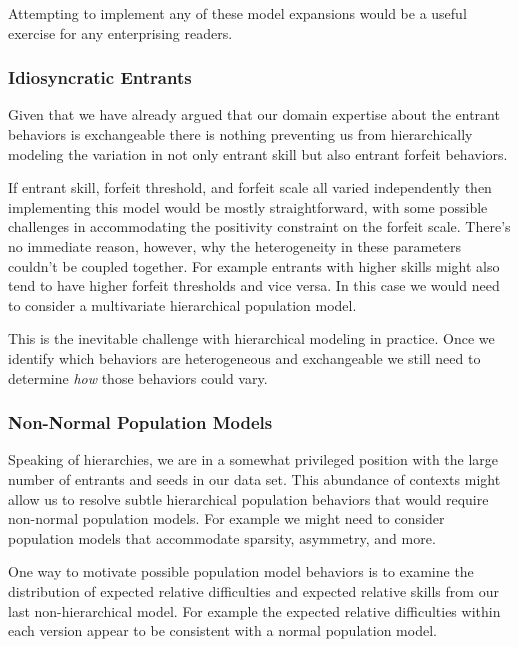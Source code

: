 \documentclass[
  letterpaper,
  DIV=11,
  numbers=noendperiod]{scrartcl}
\begin{document}
Attempting to implement any of these model expansions would be a useful
exercise for any enterprising readers.

\subsubsection{Idiosyncratic Entrants}\label{idiosyncratic-entrants}

Given that we have already argued that our domain expertise about the
entrant behaviors is exchangeable there is nothing preventing us from
hierarchically modeling the variation in not only entrant skill but also
entrant forfeit behaviors.

If entrant skill, forfeit threshold, and forfeit scale all varied
independently then implementing this model would be mostly
straightforward, with some possible challenges in accommodating the
positivity constraint on the forfeit scale. There's no immediate reason,
however, why the heterogeneity in these parameters couldn't be coupled
together. For example entrants with higher skills might also tend to
have higher forfeit thresholds and vice versa. In this case we would
need to consider a multivariate hierarchical population model.

This is the inevitable challenge with hierarchical modeling in practice.
Once we identify which behaviors are heterogeneous and exchangeable we
still need to determine \emph{how} those behaviors could vary.

\subsubsection{Non-Normal Population
Models}\label{non-normal-population-models}

Speaking of hierarchies, we are in a somewhat privileged position with
the large number of entrants and seeds in our data set. This abundance
of contexts might allow us to resolve subtle hierarchical population
behaviors that would require non-normal population models. For example
we might need to consider population models that accommodate sparsity,
asymmetry, and more.

One way to motivate possible population model behaviors is to examine
the distribution of expected relative difficulties and expected relative
skills from our last non-hierarchical model. For example the expected
relative difficulties within each version appear to be consistent with a
normal population model.
\end{document}
